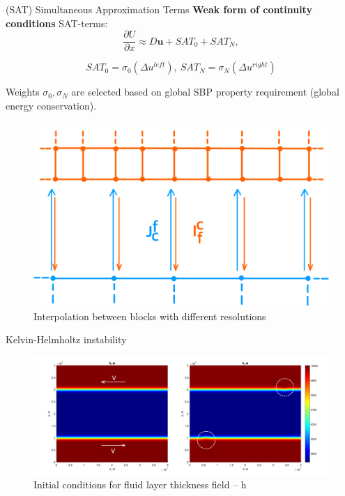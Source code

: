 \documentclass[10pt]{beamer}
\begin{document}
\begin{frame}{(SAT) Simultaneous Approximation Terms}
\textbf{Weak form of continuity conditions}
SAT-terms:
$$\frac{\partial U}{\partial x}\approx D\textbf{u} + SAT_0 + SAT_N,$$

$$SAT_0=\sigma_0 (\Delta u^{left}), \ SAT_N=\sigma_N(\Delta u^{right})$$

Weights $\sigma_0, \sigma_N$ are selected based on global SBP property requirement (global energy conservation).

\begin{figure}[h]
\centering
\includegraphics[width=0.5\linewidth]{./images/interp.png}
\caption{Interpolation between blocks with different resolutions}
\label{fig:mpr}
\end{figure}

\end{frame}




\begin{frame}{Kelvin-Helmholtz instability}

\begin{figure}[h]
\centering
\includegraphics[width=1\linewidth]{./images/initial_cond_kelhelm.png}
\caption{Initial conditions for fluid layer thickness field -- h}
\label{fig:mpr}
\end{figure}

\end{frame}
\end{document}
